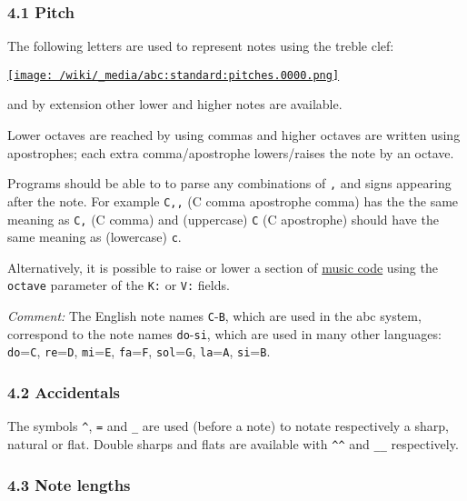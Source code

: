 \hypertarget{pitch}{\subsubsection{4.1 Pitch}\label{pitch}}

The following letters are used to represent notes using the treble clef:

\href{/wiki/_detail/abc:standard:pitches.0000.png?id=abc\%3Astandard\%3Av2.1}{\texttt{[image: /wiki/\_media/abc:standard:pitches.0000.png]}}

and by extension other lower and higher notes are available.

Lower octaves are reached by using commas and higher octaves are written
using apostrophes; each extra comma/apostrophe lowers/raises the note by
an octave.

Programs should be able to to parse any combinations of \texttt{,} and
\texttt{\textquotesingle{}} signs appearing after the note. For example
\texttt{C,\textquotesingle{},} (C comma apostrophe comma) has the the
same meaning as \texttt{C,} (C comma) and (uppercase)
\texttt{C\textquotesingle{}} (C apostrophe) should have the same meaning
as (lowercase) \texttt{c}.

Alternatively, it is possible to raise or lower a section of
\protect\hyperlink{music_code_definition}{music code} using the
\texttt{octave} parameter of the \texttt{K:} or \texttt{V:} fields.

\emph{Comment:} The English note names \texttt{C}-\texttt{B}, which are
used in the abc system, correspond to the note names
\texttt{do}-\texttt{si}, which are used in many other languages:
\texttt{do}=\texttt{C}, \texttt{re}=\texttt{D}, \texttt{mi}=\texttt{E},
\texttt{fa}=\texttt{F}, \texttt{sol}=\texttt{G}, \texttt{la}=\texttt{A},
\texttt{si}=\texttt{B}.

\hypertarget{accidentals}{\subsubsection{4.2
Accidentals}\label{accidentals}}

The symbols \texttt{\^{}}, \texttt{=} and \texttt{\_} are used (before a
note) to notate respectively a sharp, natural or flat. Double sharps and
flats are available with \texttt{\^{}\^{}} and \texttt{\_\_}
respectively.

\hypertarget{note_lengths}{\subsubsection{4.3 Note
lengths}\label{note_lengths}}

